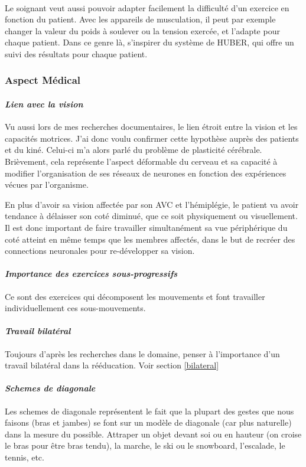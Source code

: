 \paragraph{}Le soignant veut aussi pouvoir adapter facilement la difficulté d'un exercice en fonction du patient. Avec les appareils de musculation, il peut par exemple changer la valeur du poids à soulever ou la tension exercée, et l'adapte pour chaque patient.
Dans ce genre là, s'inspirer du système de HUBER, qui offre un suivi des résultats pour chaque patient.

	\subsubsection*{Aspect Médical}

		\paragraph{\emph{Lien avec la vision}\\}
Vu aussi lors de mes recherches documentaires, le lien étroit entre la vision et les capacités motrices. J'ai donc voulu confirmer cette hypothèse auprès des patients et du kiné. Celui-ci m'a alors parlé du problème de plasticité cérébrale. Brièvement, cela représente l'aspect déformable du cerveau et sa capacité à modifier l'organisation de ses réseaux de neurones en fonction des expériences vécues par l'organisme. 

En plus d'avoir sa vision affectée par son AVC et l'hémiplégie, le patient va avoir tendance à délaisser son coté diminué, que ce soit physiquement ou visuellement. Il est donc important de faire travailler simultanément sa vue périphérique du coté atteint en même temps que les membres affectés, dans le but de recréer des connections neuronales pour re-développer sa vision.

		\paragraph{\emph{Importance des exercices sous-progressifs}\\}
Ce sont des exercices qui décomposent les mouvements et font travailler individuellement ces sous-mouvements.

		\paragraph{\emph{Travail bilatéral}\\}
Toujours d'après les recherches dans le domaine, penser à l'importance d'un travail bilatéral dans la rééducation. Voir section \ref{bilateral}


		\paragraph{\emph{Schemes de diagonale}\\}
Les schemes de diagonale représentent le fait que la plupart des gestes que nous faisons (bras et jambes) se font sur un modèle de diagonale (car plus naturelle) dans la mesure du possible. Attraper un objet devant soi ou en hauteur (on croise le bras pour être bras tendu), la marche, le ski ou le snowboard, l'escalade, le tennis, etc.	
	
